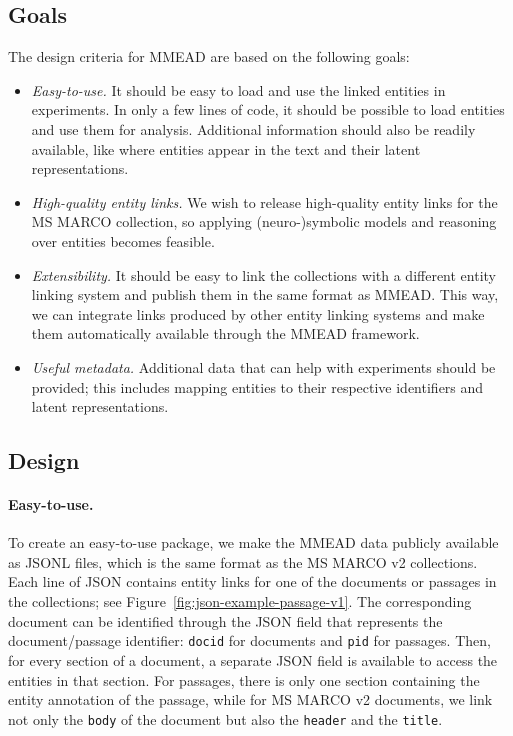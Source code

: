 \subsection{Goals}
The design criteria for MMEAD are based on the following goals:
\begin{itemize}
    \item \emph{Easy-to-use.} It should be easy to load and use the linked entities in experiments. In only a few lines of code, it should be possible to load entities and use them for analysis. Additional information should also be readily available, like where entities appear in the text and their latent representations.
	\item \emph{High-quality entity links.} We wish to release high-quality entity links for the MS MARCO collection, so applying (neuro-)symbolic models and reasoning over entities becomes feasible. 
	\item \emph{Extensibility.} It should be easy to link the collections with a different entity linking system and publish them in the same format as MMEAD. This way, we can integrate links produced by other entity linking systems and make them automatically available through the MMEAD framework. 
	\item \emph{Useful metadata.} Additional data that can help with experiments should be provided; this includes mapping entities to their respective identifiers and latent representations. 
\end{itemize}

\subsection{Design}
\paragraph{Easy-to-use.} To create an easy-to-use package, we make the MMEAD data publicly available as JSONL files, which is the same format as the MS MARCO v2 collections. Each line of JSON contains entity links for one of the documents or passages in the collections; see Figure~\ref{fig:json-example-passage-v1}. The corresponding document can be identified through the JSON field that represents the document/passage identifier: \texttt{docid} for documents and \texttt{pid} for passages. Then, for every section of a document, a separate JSON field is available to access the entities in that section. For passages, there is only one section containing the entity annotation of the passage, while for MS MARCO v2 documents, we link not only the \texttt{body} of the document but also the \texttt{header} and the \texttt{title}.

